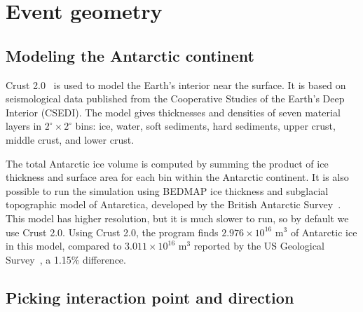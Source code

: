 \section{Event geometry}
\label{sec:eventGeometry}

\subsection{Modeling the Antarctic continent}
Crust 2.0~\cite{crust2} is used to model the Earth's interior near the 
surface.  It is based on seismological data published from the Cooperative Studies of the Earth's Deep Interior (CSEDI).
The model gives thicknesses and densities of seven material
layers in $2^{\circ} \times 2^{\circ}$ bins:  ice, water, soft sediments, hard sediments, upper crust,
middle crust, and lower crust.  

The total Antarctic ice volume is computed by summing the product of ice
thickness and surface area for each bin within the Antarctic continent.
It is also possible to run the simulation using BEDMAP ice thickness
and subglacial topographic model of Antarctica, developed by the
British Antarctic Survey~\cite{bedmap}.
This model has higher resolution, 
but it is much slower to run, so by default we use
Crust 2.0.
Using Crust 2.0, the \icemc program finds $2.976 \times 10^{16}$ m$^3$ of Antarctic ice in this model, compared to $3.011 \times 10^{16}$ m$^3$ reported by the US Geological Survey~\cite{usgs}, a 1.15\% difference.

\subsection{Picking interaction point and direction}
\label{sec:pickneutrino}

